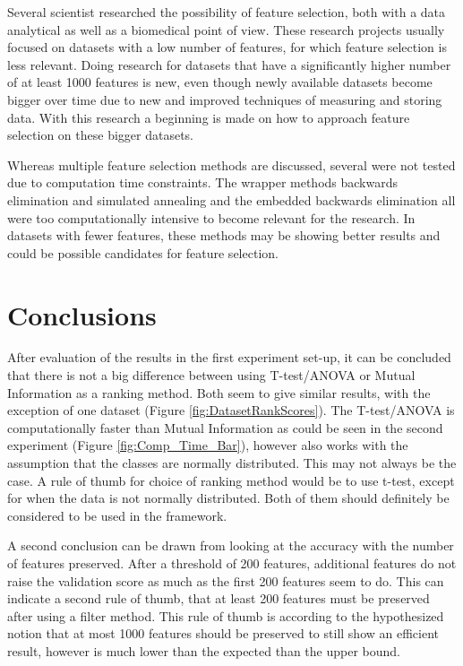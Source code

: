 	Several scientist researched the possibility of feature selection, both with a data analytical\cite{catal2009investigating} as well as a biomedical\cite{baumgartner2006data, welthagen2005comprehensive, liu2002comparative} point of view. These research projects usually focused on datasets with a low number of features, for which feature selection is less relevant. Doing research for datasets that have a significantly higher number of at least 1000 features is new, even though newly available datasets become bigger over time due to new and improved techniques of measuring and storing data. With this research a beginning is made on how to approach feature selection on these bigger datasets.
	
	Whereas multiple feature selection methods are discussed, several were not tested due to computation time constraints. The wrapper methods backwards elimination and simulated annealing and the embedded backwards elimination all were too computationally intensive to become relevant for the research. In datasets with fewer features, these methods may be showing better results and could be possible candidates for feature selection.
	
	
	\section{Conclusions}	
	\label{sec:Conclusions}
	
	After evaluation of the results in the first experiment set-up, it can be concluded that there is not a big difference between using T-test/ANOVA or Mutual Information as a ranking method. Both seem to give similar results, with the exception of one dataset (Figure \ref{fig:DatasetRankScores}). The T-test/ANOVA is computationally faster than Mutual Information as could be seen in the second experiment (Figure \ref{fig:Comp_Time_Bar}), however also works with the assumption that the classes are normally distributed. This may not always be the case. A rule of thumb for choice of ranking method would be to use t-test, except for when the data is not normally distributed. Both of them should definitely be considered to be used in the framework.
	
	A second conclusion can be drawn from looking at the accuracy with the number of features preserved. After a threshold of 200 features, additional features do not raise the validation score as much as the first 200 features seem to do. This can indicate a second rule of thumb, that at least 200 features must be preserved after using a filter method. This rule of thumb is according to the hypothesized notion that at most 1000 features should be preserved to still show an efficient result, however is much lower than the expected than the upper bound.
	
